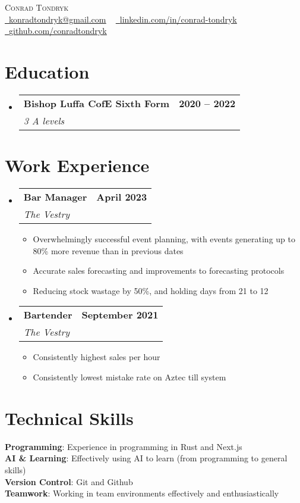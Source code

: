\documentclass[letterpaper,11pt]{article}
\makeatletter
\newcommand{\resumeItem}[1]{
  \item\small{
    {#1 \vspace{-2pt}}
  }
}
\newcommand{\resumeSubheading}[4]{
  \vspace{-2pt}\item
    \begin{tabular*}{1.0\textwidth}[t]{l@{\extracolsep{\fill}}r}
      \textbf{#1} & \textbf{\small #2} \\
      \textit{\small#3} & \textit{\small #4} \\
    \end{tabular*}\vspace{-7pt}
}
\newcommand{\resumeSubHeadingListStart}{\begin{itemize}[leftmargin=0.0in, label={}]}
\newcommand{\resumeSubHeadingListEnd}{\end{itemize}}
\newcommand{\resumeItemListStart}{\begin{itemize}}
\newcommand{\resumeItemListEnd}{\end{itemize}\vspace{-5pt}}
\makeatother
\begin{document}
\begin{center}
    {\Huge \scshape Conrad Tondryk} \\ \vspace{5pt}
    \small
    \href{mailto:konradtondryk@gmail.com}{\raisebox{-0.2\height}\faEnvelope\  \underline{konradtondryk@gmail.com}} ~
    \href{https://www.linkedin.com/in/conrad-tondryk/}{\raisebox{-0.2\height}\faLinkedin\ \underline{linkedin.com/in/conrad-tondryk}} ~
    \href{https://github.com/conradtondryk}{\raisebox{-0.2\height}\faGithub\ \underline{github.com/conradtondryk}}
    \vspace{-8pt}
\end{center}

\section{Education}
  \resumeSubHeadingListStart
    \resumeSubheading
      {Bishop Luffa CofE Sixth Form}{2020 -- 2022}
      {3 A levels}{}
  \resumeSubHeadingListEnd

\section{Work Experience}
  \resumeSubHeadingListStart

    \resumeSubheading
      {Bar Manager}{April 2023}
      {The Vestry}{}
      \resumeItemListStart
        \resumeItem{Overwhelmingly successful event planning, with events generating up to 80\% more revenue than in previous dates}
        \resumeItem{Accurate sales forecasting and improvements to forecasting protocols}
        \resumeItem{Reducing stock wastage by 50\%, and holding days from 21 to 12}
      \resumeItemListEnd

    \resumeSubheading
      {Bartender}{September 2021}
      {The Vestry}{}
      \resumeItemListStart
        \resumeItem{Consistently highest sales per hour}
        \resumeItem{Consistently lowest mistake rate on Aztec till system}
    \resumeItemListEnd

  \resumeSubHeadingListEnd
\vspace{-16pt}

\section{Technical Skills}
 \begin{itemize}[leftmargin=0.15in, label={}]
    \small{\item{
     \textbf{Programming}{: Experience in programming in Rust and Next.js} \\
     \textbf{AI \& Learning}{: Effectively using AI to learn (from programming to general skills)} \\
     \textbf{Version Control}{: Git and Github} \\
     \textbf{Teamwork}{: Working in team environments effectively and enthusiastically} \\
    }}
 \end{itemize}
 \vspace{-16pt}
\end{document}
